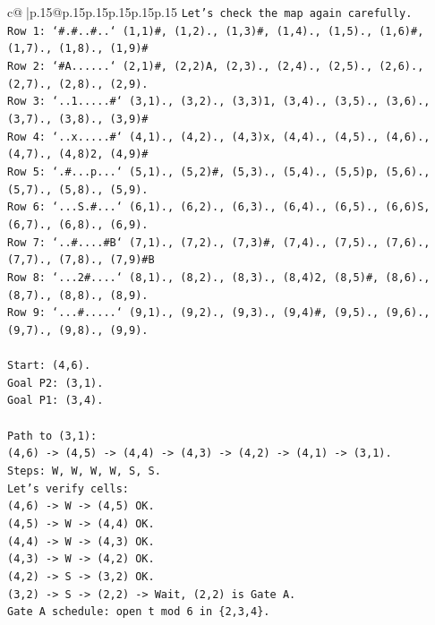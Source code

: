 \documentclass{article}
\begin{document}
{\begin{supertabular}{c@{$\;$}|p{.15\linewidth}@{}p{.15\linewidth}p{.15\linewidth}p{.15\linewidth}p{.15\linewidth}p{.15\linewidth}}
{{{\texttt{Let's check the map again carefully.} \\
\texttt{Row 1: `\#.\#..\#..` (1,1)\#, (1,2)., (1,3)\#, (1,4)., (1,5)., (1,6)\#, (1,7)., (1,8)., (1,9)\#} \\
\texttt{Row 2: `\#A......` (2,1)\#, (2,2)A, (2,3)., (2,4)., (2,5)., (2,6)., (2,7)., (2,8)., (2,9).} \\
\texttt{Row 3: `..1.....\#` (3,1)., (3,2)., (3,3)1, (3,4)., (3,5)., (3,6)., (3,7)., (3,8)., (3,9)\#} \\
\texttt{Row 4: `..x.....\#` (4,1)., (4,2)., (4,3)x, (4,4)., (4,5)., (4,6)., (4,7)., (4,8)2, (4,9)\#} \\
\texttt{Row 5: `.\#...p...` (5,1)., (5,2)\#, (5,3)., (5,4)., (5,5)p, (5,6)., (5,7)., (5,8)., (5,9).} \\
\texttt{Row 6: `...S.\#...` (6,1)., (6,2)., (6,3)., (6,4)., (6,5)., (6,6)S, (6,7)., (6,8)., (6,9).} \\
\texttt{Row 7: `..\#....\#B` (7,1)., (7,2)., (7,3)\#, (7,4)., (7,5)., (7,6)., (7,7)., (7,8)., (7,9)\#B} \\
\texttt{Row 8: `...2\#....` (8,1)., (8,2)., (8,3)., (8,4)2, (8,5)\#, (8,6)., (8,7)., (8,8)., (8,9).} \\
\texttt{Row 9: `...\#.....` (9,1)., (9,2)., (9,3)., (9,4)\#, (9,5)., (9,6)., (9,7)., (9,8)., (9,9).} \\
\\ 
\texttt{Start: (4,6).} \\
\texttt{Goal P2: (3,1).} \\
\texttt{Goal P1: (3,4).} \\
\\ 
\texttt{Path to (3,1):} \\
\texttt{(4,6) {-}> (4,5) {-}> (4,4) {-}> (4,3) {-}> (4,2) {-}> (4,1) {-}> (3,1).} \\
\texttt{Steps: W, W, W, W, S, S.} \\
\texttt{Let's verify cells:} \\
\texttt{(4,6) {-}> W {-}> (4,5) OK.} \\
\texttt{(4,5) {-}> W {-}> (4,4) OK.} \\
\texttt{(4,4) {-}> W {-}> (4,3) OK.} \\
\texttt{(4,3) {-}> W {-}> (4,2) OK.} \\
\texttt{(4,2) {-}> S {-}> (3,2) OK.} \\
\texttt{(3,2) {-}> S {-}> (2,2) {-}> Wait, (2,2) is Gate A.} \\
\texttt{Gate A schedule: open t mod 6 in \{2,3,4\}.} \\
}}}
\end{supertabular}}
\end{document}
